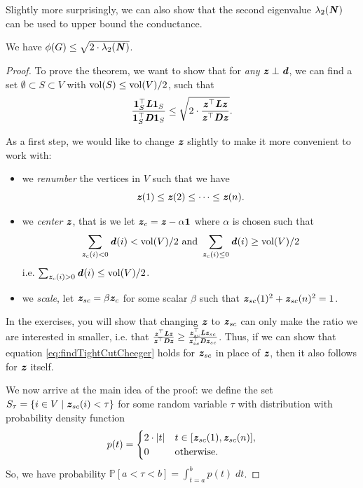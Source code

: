 Slightly more surprisingly, we can also show that the second eigenvalue $\lambda_2(\boldsymbol{\mathit{N}})$ can be used to upper bound the conductance.

\begin{theorem}\label{thm:cheegerInequUpperBound}
We have $\phi(G) \leq \sqrt{2 \cdot \lambda_2(\boldsymbol{\mathit{N}})}$.
\end{theorem}
\begin{proof}
To prove the theorem, we want to show that for \emph{any} $\boldsymbol{\mathit{z}} \perp
\boldsymbol{\mathit{d}}$, we can find a set $\emptyset \subset S \subset V$ with $\operatorname{vol}(S)
\leq \operatorname{vol}(V)/2$, such that 
\begin{equation}\label{eq:findTightCutCheeger}
\frac{\boldsymbol{1}_S^\top \boldsymbol{\mathit{L}} \boldsymbol{1}_S}{\boldsymbol{1}_S^\top \boldsymbol{\mathit{D}} \boldsymbol{1}_S}  \leq \sqrt{2 \cdot \frac{\boldsymbol{\mathit{z}}^\top \boldsymbol{\mathit{L}} \boldsymbol{\mathit{z}}}{\boldsymbol{\mathit{z}}^\top \boldsymbol{\mathit{D}} \boldsymbol{\mathit{z}}}}.    
\end{equation}

As a first step, we would like to change $\boldsymbol{\mathit{z}}$ slightly to make it more convenient to work with:
\begin{itemize}
    \item we \emph{renumber} the vertices in $V$ such that we have
    \[
    \boldsymbol{\mathit{z}}(1) \leq \boldsymbol{\mathit{z}}(2) \leq \dots \leq \boldsymbol{\mathit{z}}(n).
    \]
    \item we \emph{center} $\boldsymbol{\mathit{z}}$, that is we let $\boldsymbol{\mathit{z}}_c = \boldsymbol{\mathit{z}} - \alpha \boldsymbol{1}$ where $\alpha$ is chosen such that \begin{align*}
        \sum_{\boldsymbol{\mathit{z}}_c(i) < 0} \boldsymbol{\mathit{d}}(i) < \operatorname{vol}(V)/2 \text{ and }
        \sum_{\boldsymbol{\mathit{z}}_c(i) \leq 0} \boldsymbol{\mathit{d}}(i) \geq \operatorname{vol}(V)/2
    \end{align*}
    i.e. $\sum_{\boldsymbol{\mathit{z}}_c(i) > 0} \boldsymbol{\mathit{d}}(i) \leq \operatorname{vol}(V)/2$.
    \item we \emph{scale}, let $\boldsymbol{\mathit{z}}_{sc} = \beta \boldsymbol{\mathit{z}}_c$ for some scalar $\beta$ such that $\boldsymbol{\mathit{z}}_{sc}(1)^2 + \boldsymbol{\mathit{z}}_{sc}(n)^2 = 1$. 
\end{itemize}
In the exercises, you will show that changing $\boldsymbol{\mathit{z}}$ to $\boldsymbol{\mathit{z}}_{sc}$ can only make the ratio we are interested in smaller, i.e. that
$\frac{\boldsymbol{\mathit{z}}^\top \boldsymbol{\mathit{L}} \boldsymbol{\mathit{z}}}{\boldsymbol{\mathit{z}}^\top \boldsymbol{\mathit{D}} \boldsymbol{\mathit{z}}} \geq \frac{\boldsymbol{\mathit{z}}_{sc}^\top \boldsymbol{\mathit{L}} \boldsymbol{\mathit{z}}_{sc}}{\boldsymbol{\mathit{z}}_{sc}^\top \boldsymbol{\mathit{D}} \boldsymbol{\mathit{z}}_{sc}}$. Thus, if we can show that equation \ref{eq:findTightCutCheeger} holds for $\boldsymbol{\mathit{z}}_{sc}$ in place of $\boldsymbol{\mathit{z}}$, then it also follows for $\boldsymbol{\mathit{z}}$ itself.

We now arrive at the main idea of the proof: we define the set $S_{\tau} = \{ i \in V \;|\; \boldsymbol{\mathit{z}}_{sc}(i) < \tau\}$ for some random variable $\tau$ with distribution with probability density function
\begin{align}\label{eq:cheegerDefineDensityFun}
    p(t) = \begin{cases}
        2 \cdot |t| &t \in [\boldsymbol{\mathit{z}}_{sc}(1), \boldsymbol{\mathit{z}}_{sc}(n)],
        \\
        0 &\text{otherwise}.
        \end{cases}
\end{align}
So, we have probability $\mathbb{P}[a < \tau < b] = \int_{t=a}^b p(t)\; dt$.


\end{proof}
